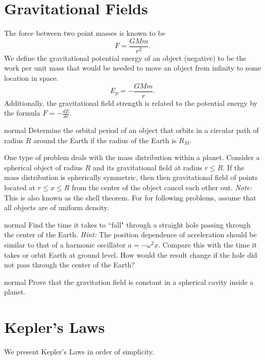 \documentclass[11pt]{article}
\begin{document}
\section{Gravitational Fields}
\vspace{-5mm}
The force between two point masses is known to be
\begin{equation}
    F=\dfrac{GMm}{r^2}.
\end{equation}
We define the gravitational potential energy of an object (negative) to be the work per unit mass that would be needed to move an object from infinity to some location in space.
\begin{equation}
    E_p=-\dfrac{GMm}{r}.
\end{equation}
Additionally, the gravitational field strength is related to the potential energy by the formula $\displaystyle F=-\frac{dE}{dr}$.
\hypertarget{P1}{}
\begin{solution}{normal}
Determine the orbital period of an object that orbits in a circular path of radius $R$ around the Earth if the radius of the Earth is $R_M$.
\end{solution}
One type of problem deals with the mass distribution within a planet. Consider a spherical object of radius $R$ and its gravitational field at radius $r\leq R$. If the mass distribution is spherically symmetric, then then gravitational field of points located at $r\leq x\leq R$ from the center of the object cancel each other out. \textit{Note:} This is also known as the shell theorem. For for following problems, assume that all objects are of uniform density.
\hypertarget{P2}{}
\begin{solution}{normal}
Find the time it takes to ``fall" through a straight hole passing through the center of the Earth. \textit{Hint:} The position dependence of acceleration should be similar to that of a harmonic oscillator $a=-\omega^2x$. Compare this with the time it takes or orbit Earth at ground level. How would the result change if the hole did not pass through the center of the Earth?
\end{solution}
\hypertarget{P3}{}
\begin{solution}{normal}
Prove that the gravitation field is constant in a spherical cavity inside a planet.
\end{solution}

\vspace{-5mm}
\section{Kepler's Laws}
\vspace{-5mm}
We present Kepler's Laws in order of simplicity.
\end{document}
